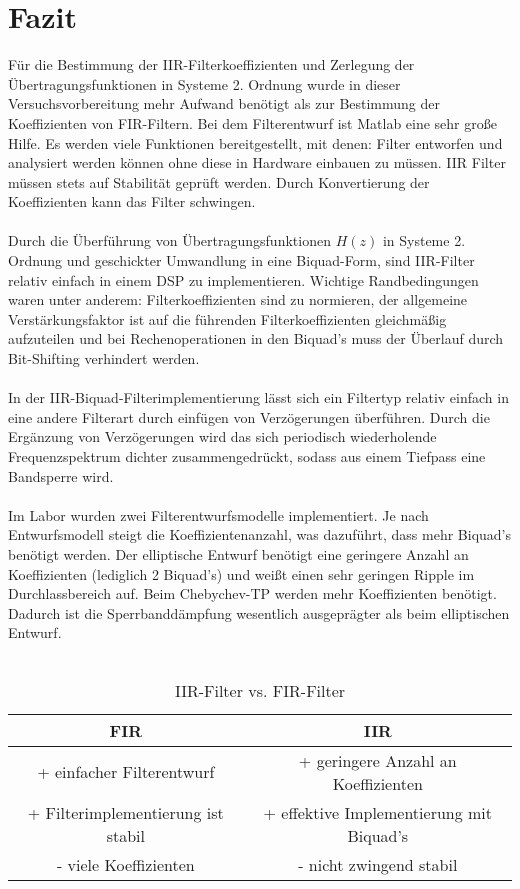 \section{Fazit}

Für die Bestimmung der IIR-Filterkoeffizienten und Zerlegung der Übertragungsfunktionen in Systeme 2. Ordnung wurde in dieser Versuchsvorbereitung mehr Aufwand benötigt als zur Bestimmung der Koeffizienten von FIR-Filtern. Bei dem Filterentwurf ist Matlab eine sehr große Hilfe. Es werden viele Funktionen bereitgestellt, mit denen: Filter entworfen und analysiert werden können ohne diese in Hardware einbauen zu müssen. IIR Filter müssen stets auf Stabilität geprüft werden. Durch Konvertierung der Koeffizienten kann das Filter schwingen.\\\\
\noindent Durch die Überführung von Übertragungsfunktionen $H(z)$ in Systeme 2. Ordnung und geschickter Umwandlung in eine Biquad-Form, sind IIR-Filter relativ einfach in einem DSP zu implementieren. Wichtige Randbedingungen waren unter anderem: Filterkoeffizienten sind zu normieren, der allgemeine Verstärkungsfaktor ist auf die führenden Filterkoeffizienten gleichmäßig aufzuteilen und bei Rechenoperationen in den Biquad's muss der Überlauf durch Bit-Shifting verhindert werden.\\\\
In der IIR-Biquad-Filterimplementierung lässt sich ein Filtertyp relativ einfach in eine andere Filterart durch einfügen von Verzögerungen überführen. Durch die Ergänzung von Verzögerungen wird das sich periodisch wiederholende Frequenzspektrum dichter zusammengedrückt, sodass aus einem Tiefpass eine Bandsperre wird.\\\\
Im Labor wurden zwei Filterentwurfsmodelle implementiert. Je nach Entwurfsmodell steigt die Koeffizientenanzahl, was dazuführt, dass mehr Biquad's benötigt werden. Der elliptische Entwurf benötigt eine geringere Anzahl an Koeffizienten (lediglich 2 Biquad's) und weißt einen sehr geringen Ripple im Durchlassbereich auf. Beim Chebychev-TP werden mehr Koeffizienten benötigt. Dadurch ist die Sperrbanddämpfung wesentlich ausgeprägter als beim elliptischen Entwurf.\\\\

\begin{table}[h]
	\centering
	\begin{tabular}{c | c}
	FIR & IIR	\\
	\hline
	+ einfacher Filterentwurf	&	+ geringere Anzahl an Koeffizienten \\
	+ Filterimplementierung ist stabil		&	+ effektive Implementierung mit Biquad's\\
	- viele Koeffizienten	& - nicht zwingend stabil\\
	\end{tabular}
	\caption{IIR-Filter vs. FIR-Filter}
\end{table}
